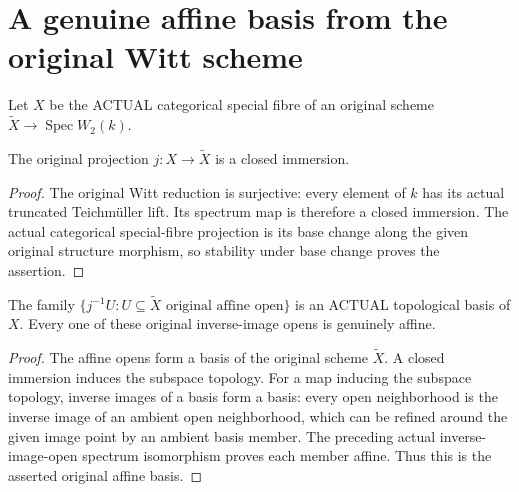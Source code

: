 \section{A genuine affine basis from the original Witt scheme}
\label{sec:witt-two-special-fibre-basis}

Let $X$ be the ACTUAL categorical special fibre of an original
scheme $\widetilde X\to\operatorname{Spec}W_2(k)$.

\begin{theorem}
\label{thm:witt-two-special-fibre-projection-closed-immersion}
\leanok
The original projection $j:X\to\widetilde X$ is a closed immersion.
\end{theorem}
\begin{proof}
The original Witt reduction is surjective: every element of $k$
has its actual truncated Teichm\"uller lift. Its spectrum map is
therefore a closed immersion. The actual categorical special-fibre
projection is its base change along the given original structure
morphism, so stability under base change proves the assertion.
\end{proof}

\begin{theorem}
\label{thm:witt-two-special-fibre-original-affine-basis}
\leanok
The family $\{j^{-1}U: U\subseteq\widetilde X\text{ original affine open}\}$
is an ACTUAL topological basis of $X$. Every one of these original
inverse-image opens is genuinely affine.
\end{theorem}
\begin{proof}
The affine opens form a basis of the original scheme
$\widetilde X$. A closed immersion induces the subspace topology.
For a map inducing the subspace topology, inverse images of a
basis form a basis: every open neighborhood is the inverse image
of an ambient open neighborhood, which can be refined around
the given image point by an ambient basis member. The preceding
actual inverse-image-open spectrum isomorphism proves each
member affine. Thus this is the asserted original affine basis.
\end{proof}

